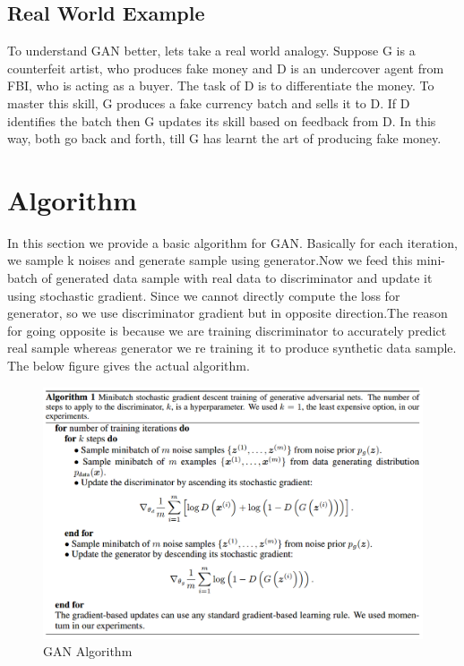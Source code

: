 \subsection{Real World Example}
To understand GAN better, lets take a real world analogy. Suppose G is a counterfeit artist, who produces fake money and D is an undercover agent from FBI, who is acting as a buyer. The task of D is to differentiate the money. To master this skill, G produces a fake currency batch and sells it to D. If D identifies the batch then G updates its skill based on feedback from D. %
In this way, both go back and forth, till G has learnt the art of producing fake money.
\section{Algorithm}
In this section we provide a basic algorithm for GAN. Basically for each iteration, we sample k noises and generate sample using generator.Now we feed this mini-batch of generated data sample with real data to discriminator and update it using stochastic gradient. Since we cannot directly compute the loss for generator, so we use discriminator gradient but in opposite direction.The reason for going opposite is because we are training discriminator to accurately predict real sample whereas generator we re training it to produce synthetic data sample. The below figure gives the actual algorithm.
\begin{figure}[!htb]

  \centering
    \includegraphics[scale=.4, angle=0]{Files/Algorithm.png}
    \caption[Vanilla GAN Algorithm]{ GAN Algorithm\cite{Gan-overview}}
    \label{fig: GAN Algorithm}
\end{figure}

